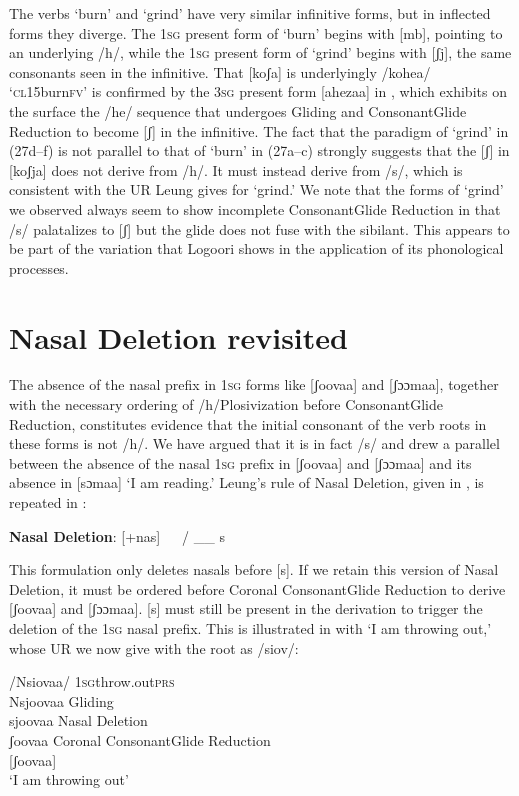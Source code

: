 \documentclass[output=paper]{langsci/langscibook}
\begin{document}
The verbs ‘burn’ and ‘grind’ have very similar infinitive forms, but in inflected forms they diverge. The 1\textsc{sg} present form of ‘burn’ begins with [mb], pointing to an underlying /h/, while the 1\textsc{sg} present form of ‘grind’ begins with [ʃj], the same consonants seen in the infinitive. That [koʃa] is underlyingly /kohea/ ‘\textsc{cl}15burn\textsc{fv’} is confirmed by the 3\textsc{sg} present form [ahezaa] in , which exhibits on the surface the /he/ sequence that undergoes Gliding and ConsonantGlide Reduction to become [ʃ] in the infinitive. The fact that the paradigm of ‘grind’ in (27d–f) is not parallel to that of ‘burn’ in (27a–c) strongly suggests that the [ʃ] in [koʃja] does not derive from /h/. It must instead derive from /s/, which is consistent with the UR Leung gives for ‘grind.’ We note that the forms of ‘grind’ we observed always seem to show incomplete ConsonantGlide Reduction in that /s/ palatalizes to [ʃ] but the glide does not fuse with the sibilant. This appears to be part of the variation that Logoori shows in the application of its phonological processes.

\section{Nasal Deletion revisited}

The absence of the nasal prefix in 1\textsc{sg} forms like [ʃoovaa] and [ʃɔɔmaa], together with the necessary ordering of /h/Plosivization before ConsonantGlide Reduction, constitutes evidence that the initial consonant of the verb roots in these forms is not /h/. We have argued that it is in fact /s/ and drew a parallel between the absence of the nasal 1\textsc{sg} prefix in [ʃoovaa] and [ʃɔɔmaa] and its absence in [sɔmaa] ‘I am reading.’ Leung’s rule of Nasal Deletion, given in , is repeated in :

\ea{}
 \textbf{Nasal Deletion}: [+nas]   / \_\_ s\\{}
\z

This formulation only deletes nasals before [s]. If we retain this version of Nasal Deletion, it must be ordered before Coronal ConsonantGlide Reduction to derive [ʃoovaa] and [ʃɔɔmaa]. [s] must still be present in the derivation to trigger the deletion of the 1\textsc{sg} nasal prefix. This is illustrated in  with ‘I am throwing out,’ whose UR we now give with the root as /siov/:

\ea{}
 /Nsiovaa/  \textsc{1sg}throw.out\textsc{prs}\\{}
Nsjoovaa  Gliding\\{}
sjoovaa   Nasal Deletion\\{}
ʃoovaa  Coronal ConsonantGlide Reduction\\{}
[ʃoovaa] \\{}
\glt  ‘I am throwing out’
\z
\end{document}
